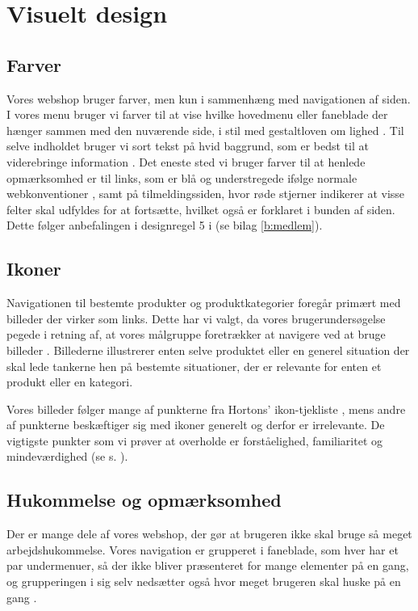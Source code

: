 \section{Visuelt design}

\subsection{Farver}
Vores webshop bruger farver, men kun i sammenhæng med navigationen af siden. I vores menu bruger vi farver til at vise hvilke hovedmenu eller faneblade
der hænger sammen med den nuværende side, i stil med gestaltloven om lighed \cite[s. 336]{Benyon2010}. Til selve indholdet bruger vi sort tekst
på hvid baggrund, som er bedst til at viderebringe information \cite[s. 430]{marcus}. Det eneste sted vi bruger farver til at henlede opmærksomhed er
til links, som er blå og understregede ifølge normale webkonventioner \cite[s. 385]{Benyon2010}, samt på tilmeldingssiden, hvor røde stjerner indikerer at visse felter skal udfyldes for at fortsætte, hvilket også er forklaret i bunden af siden. Dette følger anbefalingen i designregel 5 i \cite[s. 344]{Benyon2010} (se bilag \ref{b:medlem}).

\subsection{Ikoner}
Navigationen til bestemte produkter og produktkategorier foregår primært med billeder der virker som links. Dette har vi valgt, da vores brugerundersøgelse
pegede i retning af, at vores målgruppe foretrækker at navigere ved at bruge billeder \cite{os}. Billederne illustrerer enten selve produktet eller en generel situation
der skal lede tankerne hen på bestemte situationer, der er relevante for enten et produkt eller en kategori. 

Vores billeder følger mange af punkterne fra Hortons' ikon-tjekliste \cite[s. 327]{Benyon2010}, mens andre af punkterne beskæftiger sig med ikoner generelt
og derfor er irrelevante. De vigtigste punkter som vi prøver at overholde er forståelighed, familiaritet og mindeværdighed (se s. \pageref{b:p:tilbud}).

\subsection{Hukommelse og opmærksomhed}
Der er mange dele af vores webshop, der gør at brugeren ikke skal bruge så meget arbejdshukommelse. Vores navigation er grupperet i faneblade, som hver har et par
undermenuer, så der ikke bliver præsenteret for mange elementer på en gang, og grupperingen i sig selv nedsætter også hvor meget brugeren skal huske på en gang
\cite[s. 339]{Benyon2010}.

